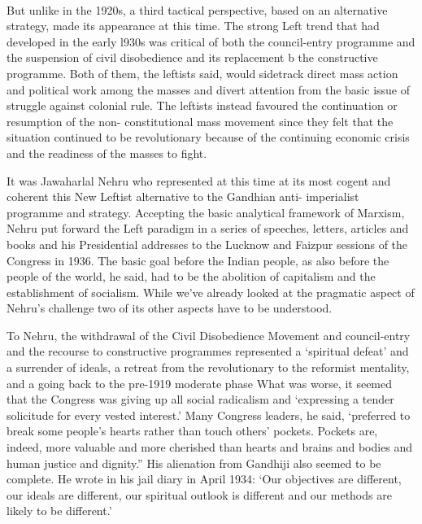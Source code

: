\paragraph*{}


But unlike in the 1920s, a third tactical perspective, based on an alternative strategy, made its appearance at this time. The strong Left trend that had developed in the early l930s was critical of both the council-entry programme and the suspension of civil disobedience and its replacement b the constructive programme. Both of them, the leftists said, would sidetrack direct mass action and political work among the masses and divert attention from the basic issue of struggle against colonial rule. The leftists instead favoured the continuation or resumption of the non- constitutional mass movement since they felt that the situation continued to be revolutionary because of the continuing economic crisis and the readiness of the masses to fight. 

It was Jawaharlal Nehru who represented at this time at its most cogent and coherent this New Leftist alternative to the Gandhian anti- imperialist programme and strategy. Accepting the basic analytical framework of Marxism, Nehru put forward the Left paradigm in a series of speeches, letters, articles and books and his Presidential addresses to the Lucknow and Faizpur sessions of the Congress in 1936. The basic goal before the Indian people, as also before the people of the world, he said, had to be the abolition of capitalism and the establishment of socialism. While we've already looked at the pragmatic aspect of Nehru's challenge two of its other aspects have to be understood. 

To Nehru, the withdrawal of the Civil Disobedience Movement and council-entry and the recourse to constructive programmes represented a `spiritual defeat' and a surrender of ideals, a retreat from the revolutionary to the reformist mentality, and a going back to the pre-1919 moderate phase What was worse, it seemed that the Congress was giving up all social radicalism and `expressing a tender solicitude for every vested interest.' Many Congress leaders, he said, `preferred to break some people's hearts rather than touch others' pockets. Pockets are, indeed, more valuable and more cherished than hearts and brains and bodies and human justice and dignity.'' His alienation from Gandhiji also seemed to be complete. He wrote in his jail diary in April 1934: `Our objectives are different, our ideals are different, our spiritual outlook is different and our methods are likely to be different.' 


